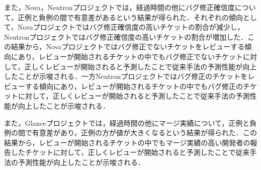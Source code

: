 \documentclass[submit]{ipsj}
\begin{document}
また，Nova，Neutronプロジェクトでは，経過時間の他にバグ修正確信度について，正例と負例の間で有意差があるという結果が得られた．それぞれの傾向として，Novaプロジェクトではバグ修正確信度の高いチケットの割合が減少し，Neutronプロジェクトではバグ修正確信度の高いチケットの割合が増加した．この結果から，Novaプロジェクトではバグ修正でないチケットをレビューする傾向にあり，レビューが開始されるチケットの中でもバグ修正でないチケットに対して，正しくレビューが開始されると予測したことで従来手法の予測性能が向上したことが示唆される．一方Neutronプロジェクトではバグ修正のチケットをレビューする傾向にあり，レビューが開始されるチケットの中でもバグ修正のチケットに対して，正しくレビューが開始されると予測したことで従来手法の予測性能が向上したことが示唆される．

また，Glanceプロジェクトでは，経過時間の他にマージ実績について，正例と負例の間で有意差があり，正例の方が値が大きくなるという結果が得られた．この結果から，レビューが開始されるチケットの中でもマージ実績の高い開発者の報告したチケットに対して，正しくレビューが開始されると予測したことで従来手法の予測性能が向上したことが示唆される．


\begin{table}[t]
\caption{レビュー予測モデルにおいて重要度の高い説明変数の正例と負例の有意差および違い}
\label{table:review_importance_yuisa}
\centering
\vspace{0.5zh}
\end{table}
\end{document}
